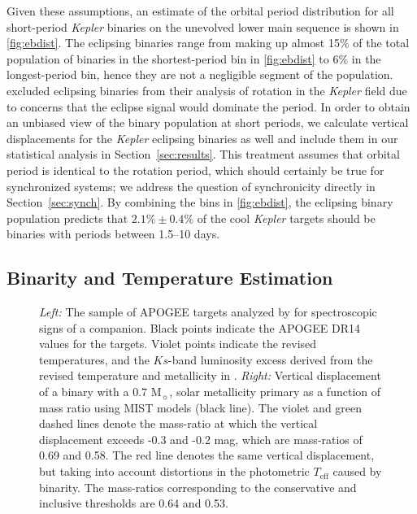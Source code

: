 \documentclass[twocolumn]{aastex6}
\newcommand{\Kepler}{\mbox{\textit{Kepler}}}
\newcommand{\Teff}{\ensuremath{T_{\textrm{eff}}}}
\begin{document}
Given these assumptions, an estimate of the orbital period distribution 
for all short-period \Kepler{} binaries on the unevolved lower main sequence is 
shown in \cref{fig:ebdist}. The eclipsing binaries range from making up almost 
15\% of the total population of binaries in the shortest-period bin in 
\cref{fig:ebdist} to 6\% in the longest-period bin, hence they are not a 
negligible segment of the population. \citet{McQuillan14} excluded eclipsing 
binaries from their analysis of rotation in the \Kepler{} field due to concerns 
that the eclipse signal would dominate the period. In order to obtain an 
unbiased view of the binary population at short periods, we calculate vertical 
displacements for the \Kepler{} eclipsing binaries as well and include them in 
our statistical analysis in Section~\ref{sec:results}. This treatment assumes that 
orbital period is identical to the rotation period, which should certainly be 
true for synchronized systems; we address the question of synchronicity 
directly in Section~\ref{sec:synch}. By combining the bins in
\cref{fig:ebdist}, the eclipsing binary population predicts that 
\(2.1\% \pm 0.4\%\) of the cool \Kepler{} targets should be binaries with
periods between 1.5--10 days.

\subsection{Binarity and Temperature Estimation}

\begin{figure*}[htb]
    \centering
    \caption{\emph{Left:} The sample of APOGEE targets analyzed by 
        \citet{ElBadry18b} for
    spectroscopic signs of a companion. Black points indicate the APOGEE DR14 
values for the targets. Violet points indicate the revised temperatures, and the
\(Ks\)-band luminosity excess derived from the revised temperature and 
metallicity in \citet{ElBadry18b}. \emph{Right:} Vertical displacement of a 
binary with a 0.7 M\(_\sun\), solar metallicity primary as a function of mass 
ratio using MIST models (black line). The violet and green dashed lines denote 
the mass-ratio at which the vertical displacement exceeds -0.3 and -0.2  mag, 
which are mass-ratios of 0.69 and 0.58. The red line denotes the same vertical 
displacement, but taking into account distortions in the photometric \Teff{} 
caused by binarity. The mass-ratios corresponding to the conservative and 
inclusive thresholds are 0.64 and 0.53. }
    \label{fig:binary_teff}
\end{figure*}
\end{document}
